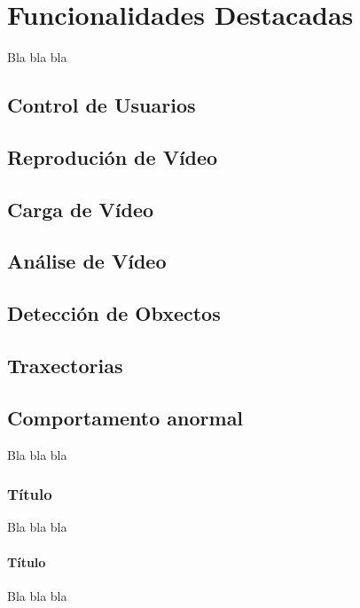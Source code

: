 \chapter{Funcionalidades Destacadas}

Bla bla bla

\section{Control de Usuarios}

\section{Reprodución de Vídeo}

\section{Carga de Vídeo}

\section{Análise de Vídeo}

\section{Detección de Obxectos}

\section{Traxectorias}

\section{Comportamento anormal}


Bla bla bla

\subsection{Título}

Bla bla bla

\subsubsection{Título}

Bla bla bla
